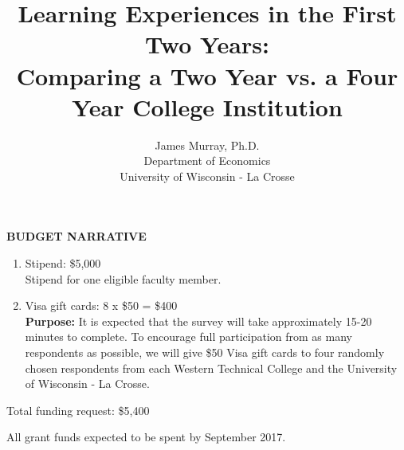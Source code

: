 \documentclass[11pt]{article}
\newcommand{\be}{
  \begin{enumerate}
  \setlength{\itemsep}{0pt}
  \setlength{\parskip}{0pt}
}
\newcommand{\ee}{\end{enumerate}}
\begin{document}
\thispagestyle{empty}
\setcounter{page}{1}

\title{Learning Experiences in the First Two Years:\\Comparing a Two Year vs. a Four Year College Institution}
\author{James Murray, Ph.D.\\Department of Economics\\University of Wisconsin - La Crosse}

\maketitle

\begin{center}\textbf{BUDGET NARRATIVE}\end{center}

\be
\item Stipend: \$5,000
  \ \\
  Stipend for one eligible faculty member.
  \ \\
  
\item Visa gift cards: 8 x \$50 = \$400
  \ \\
  \textbf{Purpose:} It is expected that the survey will take approximately 15-20 minutes to complete.  To encourage full participation from as many respondents as possible, we will give \$50 Visa gift cards to four randomly chosen respondents from each Western Technical College and the University of Wisconsin - La Crosse.
  \ee

Total funding request: \$5,400

All grant funds expected to be spent by September 2017.
\end{document}
